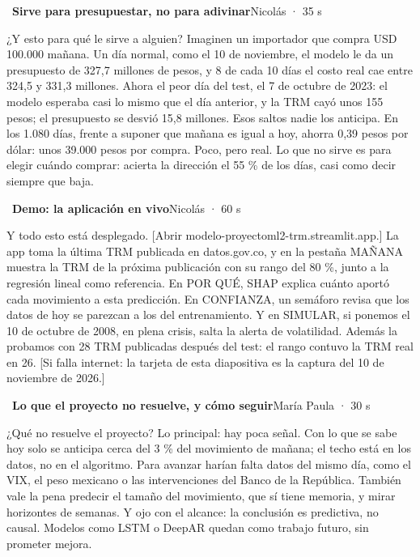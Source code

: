 \documentclass[11pt,letterpaper]{article}
\newcommand{\diapo}[4]{\par\bigskip{\color{oro}\textbf{#1.}}~\textbf{#2}\hfill{\small #3 · #4}\par\nopagebreak\smallskip}
\begin{document}
\diapo{14}{Sirve para presupuestar, no para adivinar}{Nicolás}{35 s}
¿Y esto para qué le sirve a alguien? Imaginen un importador que compra USD 100.000 mañana. Un día normal, como el 10 de noviembre, el modelo le da un presupuesto de 327,7 millones de pesos, y 8 de cada 10 días el costo real cae entre 324,5 y 331,3 millones. Ahora el peor día del test, el 7 de octubre de 2023: el modelo esperaba casi lo mismo que el día anterior, y la TRM cayó unos 155 pesos; el presupuesto se desvió 15,8 millones. Esos saltos nadie los anticipa. En los 1.080 días, frente a suponer que mañana es igual a hoy, ahorra 0,39 pesos por dólar: unos 39.000 pesos por compra. Poco, pero real. Lo que no sirve es para elegir cuándo comprar: acierta la dirección el 55 \% de los días, casi como decir siempre que baja.

\diapo{15}{Demo: la aplicación en vivo}{Nicolás}{60 s}
Y todo esto está desplegado. [Abrir modelo-proyectoml2-trm.streamlit.app.] La app toma la última TRM publicada en datos.gov.co, y en la pestaña MAÑANA muestra la TRM de la próxima publicación con su rango del 80 \%, junto a la regresión lineal como referencia. En POR QUÉ, SHAP explica cuánto aportó cada movimiento a esta predicción. En CONFIANZA, un semáforo revisa que los datos de hoy se parezcan a los del entrenamiento. Y en SIMULAR, si ponemos el 10 de octubre de 2008, en plena crisis, salta la alerta de volatilidad. Además la probamos con 28 TRM publicadas después del test: el rango contuvo la TRM real en 26. [Si falla internet: la tarjeta de esta diapositiva es la captura del 10 de noviembre de 2026.]

\diapo{16}{Lo que el proyecto no resuelve, y cómo seguir}{María Paula}{30 s}
¿Qué no resuelve el proyecto? Lo principal: hay poca señal. Con lo que se sabe hoy solo se anticipa cerca del 3 \% del movimiento de mañana; el techo está en los datos, no en el algoritmo. Para avanzar harían falta datos del mismo día, como el VIX, el peso mexicano o las intervenciones del Banco de la República. También vale la pena predecir el tamaño del movimiento, que sí tiene memoria, y mirar horizontes de semanas. Y ojo con el alcance: la conclusión es predictiva, no causal. Modelos como LSTM o DeepAR quedan como trabajo futuro, sin prometer mejora.
\par{}
\end{document}
